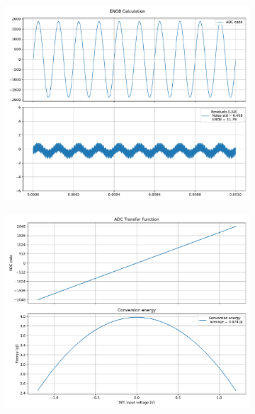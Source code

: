 \documentclass[varwidth]{standalone}
\begin{document}
\begin{figure}
\begin{subfigure}{0.32\textwidth}
    \includegraphics[width=\textwidth]{caeleste_2_enob.pdf}
\end{subfigure}
\begin{subfigure}{0.32\textwidth}
    \begin{table}
    \let\center\empty
    \let\endcenter\relax
    \centering
    \resizebox{0.3\width}{!}{}
    \end{table}
    \includegraphics[width=\textwidth]{caeleste_2_energy.pdf}
\end{subfigure}
\end{figure}
\end{document}
